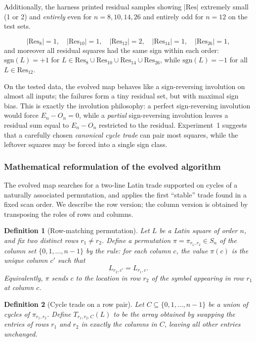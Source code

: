 \documentclass[11pt]{amsart}
\newtheorem{definition}{Definition}
\newcommand{\sgn}{\mathrm{sgn}}
\newcommand{\Res}{\mathrm{Res}}
\begin{document}
Additionally, the harness printed residual samples showing $\lvert\Res\rvert$ extremely small (1 or 2) and \emph{entirely} even for $n=8,10,14,26$ and entirely odd for $n=12$ on the test sets.

\[
|\Res_8|=1,\quad |\Res_{10}|=1,\quad |\Res_{12}|=2,\quad |\Res_{14}|=1,\quad |\Res_{26}|=1,
\]
and moreover all residual squares had the same sign within each order:
$\sgn(L)=+1$ for $L\in\Res_8\cup\Res_{10}\cup\Res_{14}\cup\Res_{26}$, while $\sgn(L)=-1$ for all $L\in\Res_{12}$.


On the tested data, the evolved map behaves like a sign-reversing involution on almost all inputs; the failures form a tiny residual set, but with maximal sign bias.
This is exactly the involution philosophy: a perfect sign-reversing involution would force $E_n-O_n=0$, while a \emph{partial} sign-reversing involution leaves a residual sum equal to $E_n-O_n$ restricted to the residual.
Experiment~1 suggests that a carefully chosen \emph{canonical cycle trade} can pair most squares, while the leftover squares may be forced into a single sign class.

\subsubsection{Mathematical reformulation of the evolved algorithm}

The evolved map searches for a two-line Latin trade supported on cycles of a naturally associated permutation, and applies the first ``stable'' trade found in a fixed scan order.  We describe the row version; the column version is obtained by transposing the roles of rows and columns.

\begin{definition}[Row-matching permutation]
Let $L$ be a Latin square of order $n$, and fix two distinct rows $r_1\neq r_2$.
Define a permutation $\pi=\pi_{r_1,r_2}\in S_n$ of the column set $\{0,1,\dots,n-1\}$ by the rule:
for each column $c$, the value $\pi(c)$ is the unique column $c'$ such that
\[
L_{r_2,c'}=L_{r_1,c}.
\]
Equivalently, $\pi$ sends $c$ to the location in row $r_2$ of the symbol appearing in row $r_1$ at column $c$.
\end{definition}

\begin{definition}[Cycle trade on a row pair]
Let $C\subseteq\{0,1,\dots,n-1\}$ be a union of cycles of $\pi_{r_1,r_2}$.
Define $T_{r_1,r_2,C}(L)$ to be the array obtained by swapping the entries of rows $r_1$ and $r_2$ in exactly the columns in $C$, leaving all other entries unchanged.
\end{definition}
\end{document}
